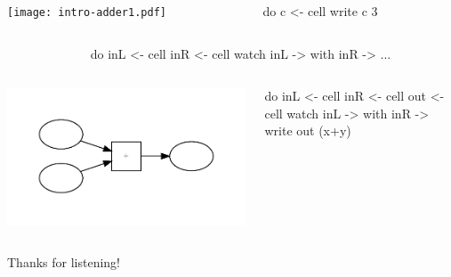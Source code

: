 \documentclass[UKenglish,usenames,dvipsnames,svgnames,table,aspectratio=169,mathserif]{beamer}
\begin{document}
\begin{frame}[fragile]
\begin{columns}
\begin{column}{0.5\textwidth}
\texttt{[image: intro-adder1.pdf]}
\end{column}
\begin{column}{0.5\textwidth}
\begin{haskellcode}
do
  c <- cell
  write c 3
\end{haskellcode}
\end{column}
\end{columns}
\end{frame}

\begin{frame}[fragile]
\begin{columns}
\begin{column}{0.5\textwidth}
\huge

\end{column}
\begin{column}{0.5\textwidth}
\begin{haskellcode}
do
  inL <- cell
  inR <- cell
  watch inL \x ->
    with inR \y ->
    ...
\end{haskellcode}
\end{column}
\end{columns}
\end{frame}

\begin{frame}[fragile]
\begin{columns}
\begin{column}{0.5\textwidth}
\includegraphics{prop2.pdf}
\end{column}
\begin{column}{0.5\textwidth}
\begin{haskellcode}
do
  inL <- cell
  inR <- cell
  out <- cell
  watch inL \x ->
    with inR \y ->
    write out (x+y)
\end{haskellcode}
\end{column}
\end{columns}
\end{frame}


\begin{frame}
\Huge

\end{frame}



\fi

\begin{frame}
\huge \centering
Thanks for listening!
\end{frame}
\end{document}
